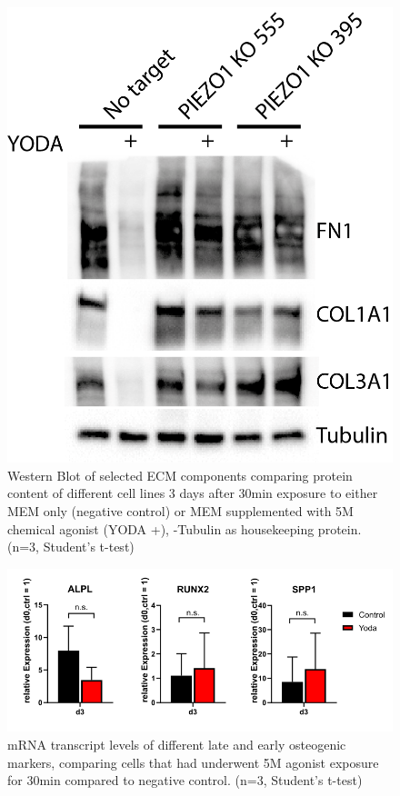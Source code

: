 \begin{figure}
\centering
\includegraphics[width=0.7\linewidth]{Uli_Blot_KO.png}
\caption{Western Blot of selected ECM components comparing protein content of different cell lines 3 days after 30min exposure to either MEM\textalpha{} only (negative control) or MEM\textalpha{} supplemented with 5\textmu{}M chemical \Piezo{} agonist (YODA +), \textalpha{}-Tubulin as housekeeping protein. (n=3, Student's t-test)
}
\label{pic:UliBlot}
\end{figure}


\begin{figure}[htbp]
\centering
\includegraphics[width = \linewidth]{Osteogenic_PCR_Yoda.png}
\caption{mRNA transcript levels of different late and early osteogenic markers, comparing cells that had underwent 5\textmu{}M \Piezo{} agonist exposure for 30min compared to negative control. (n=3, Student's t-test)}
\label{fig:Long_Term_PCR}
\end{figure}

